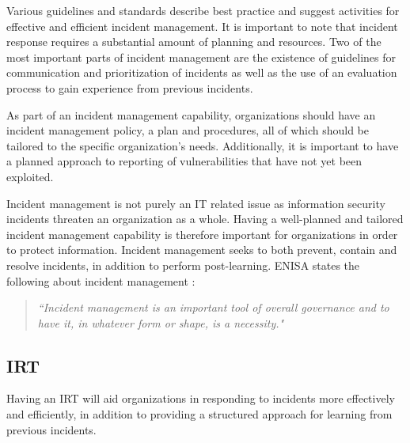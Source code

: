Various guidelines and standards describe best practice and suggest activities for effective and efficient incident management. It is important to note that incident response requires a substantial amount of planning and resources. Two of the most important parts of incident management are the existence of guidelines for communication and prioritization of incidents as well as the use of an evaluation process to gain experience from previous incidents. \cite{nist800-61}

As part of an incident management capability, organizations should have an incident management policy, a plan and procedures, all of which should be tailored to the specific organization's needs. Additionally, it is important to have a planned approach to reporting of vulnerabilities that have not yet been exploited. \cite{ISO/IEC27035}



Incident management is not purely an IT related issue as information security incidents threaten an organization as a whole. Having a well-planned and tailored incident management capability is therefore important for organizations in order to protect information. Incident management seeks to both prevent, contain and resolve incidents, in addition to perform post-learning. ENISA states the following about incident management \cite{enisaGuide}: 

\begin{quote}
\textit{``Incident management is an important tool of overall governance and to have it, in whatever form or shape, is a necessity."}
\end{quote}

\subsection{\acl{IRT}}
Having an \ac{IRT} will aid organizations in responding to incidents more effectively and efficiently, in addition to providing a structured approach for learning from previous incidents. 

